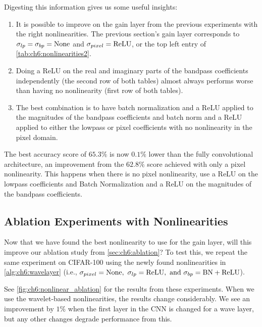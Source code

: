 Digesting this information gives us some useful insights: 
\begin{enumerate}
  \item It is possible to improve on the gain layer from the previous experiments
    with the right nonlinearities. The previous section's gain layer corresponds
    to $\sigma_{lp} = \sigma_{bp} = \mathrm{None}$ and $\sigma_{pixel} = \mathrm{ReLU}$, or
    the top left entry of \autoref{tab:ch6:nonlinearities2}.
  \item Doing a ReLU on the real and imaginary parts of the bandpass
    coefficients independently (the second row of both tables) almost always
    performs worse than having no nonlinearity (first row of both tables).
  \item The best combination is to have batch normalization and a ReLU applied
    to the magnitudes of the bandpass coefficients and batch norm and a ReLU
    applied to either the lowpass or pixel coefficients with no nonlinearity in
    the pixel domain.
\end{enumerate}

The best accuracy score of $65.3\%$ is now $0.1\%$ lower than the fully
convolutional architecture, an improvement from the $62.8\%$ score achieved with
only a pixel nonlinearity. This happens when there is no pixel nonlinearity, use
a ReLU on the lowpass coefficients and Batch Normalization and a ReLU on the
magnitudes of the bandpass coefficients.

\subsection{Ablation Experiments with Nonlinearities}
Now that we have found the best nonlinearity to use for the gain layer,
will this improve our ablation study from \autoref{sec:ch6:ablation}? To test this, 
we repeat the same experiment on CIFAR-100 using the newly found nonlinearities
in \autoref{alg:ch6:wavelayer} (i.e., $\sigma_{pixel} = \mathrm{None},\ \sigma_{lp} =
\mathrm{ReLU},\ \text{and } \sigma_{bp} = \mathrm{BN+ReLU}$).

See \autoref{fig:ch6:nonlinear_ablation} for the results from these experiments.
When we use the wavelet-based nonlinearities, the results change considerably. 
We see an improvement by $1\%$ when the first layer in the CNN is
changed for a wave layer, but any other changes degrade performance from this.

